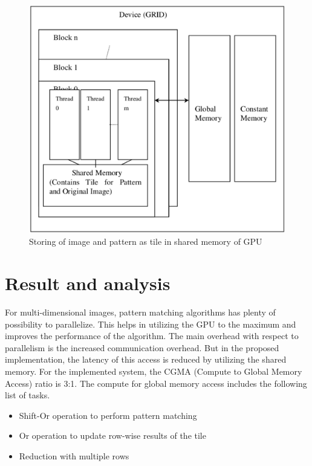 \documentclass[graybox]{svmult}
\begin{document}
\begin{figure}
\sidecaption
\includegraphics[scale=.50]{GPUin.eps}
%
%
\caption{Storing of image and pattern as tile in shared memory of GPU}
\label{fig:2}       %
\end{figure}

\section{Result and analysis}
\label{sec:4}
For multi-dimensional images, pattern matching algorithms has plenty of possibility to parallelize. This helps in utilizing the GPU to the maximum and improves the performance of the algorithm. The main overhead with respect to parallelism is the increased communication overhead. But in the proposed implementation, the latency of this access is reduced by utilizing the shared memory. For the implemented system, the CGMA (Compute to Global Memory Access) ratio is 3:1. The compute for global
memory access includes the following list of tasks.

\begin{itemize}
\item{Shift-Or operation to perform pattern matching}
\item{Or operation to update row-wise results of the tile}
\item{Reduction with multiple rows}
\end{itemize}
\end{document}
